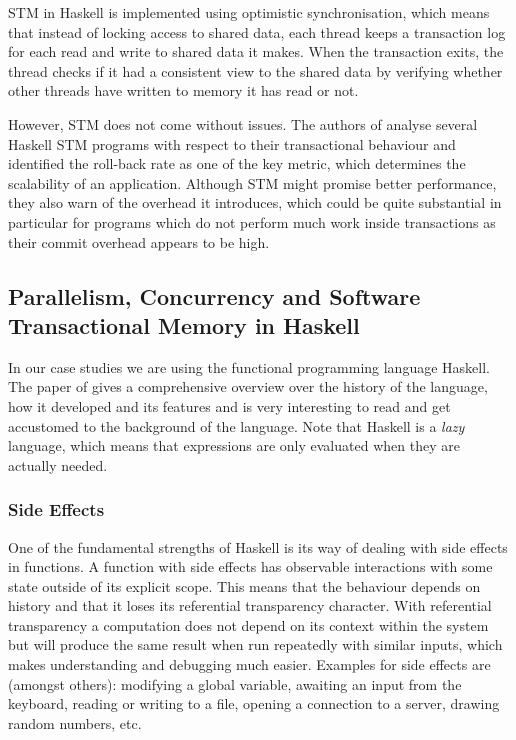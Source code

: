 STM in Haskell is implemented using optimistic synchronisation, which means that instead of locking access to shared data, each thread keeps a transaction log for each read and write to shared data it makes. When the transaction exits, the thread checks if it had a consistent view to the shared data by verifying whether other threads have written to memory it has read or not. %

However, STM does not come without issues. The authors of \cite{perfumo_limits_2008} analyse several Haskell STM programs with respect to their transactional behaviour and identified the roll-back rate as one of the key metric, which determines the scalability of an application. Although STM might promise better performance, they also warn of the overhead it introduces, which could be quite substantial in particular for programs which do not perform much work inside transactions as their commit overhead appears to be high.

\subsection{Parallelism, Concurrency and Software Transactional Memory in Haskell}
In our case studies we are using the functional programming language Haskell. The paper of \cite{hudak_history_2007} gives a comprehensive overview over the history of the language, how it developed and its features and is very interesting to read and get accustomed to the background of the language. Note that Haskell is a \textit{lazy} language, which means that expressions are only evaluated when they are actually needed.

\subsubsection{Side Effects}
\label{sub:side_effects}
One of the fundamental strengths of Haskell is its way of dealing with side effects in functions. A function with side effects has observable interactions with some state outside of its explicit scope. This means that the behaviour depends on history and that it loses its referential transparency character. With referential transparency a computation does not depend on its context within the system but will produce the same result when run repeatedly with similar inputs, which makes understanding and debugging much easier. Examples for side effects are (amongst others): modifying a global variable, awaiting an input from the keyboard, reading or writing to a file, opening a connection to a server, drawing random numbers, etc.

